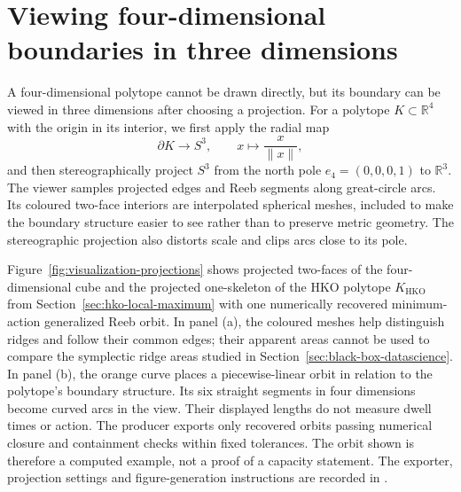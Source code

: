 \section{Viewing four-dimensional boundaries in three dimensions}
\label{sec:visualization-3d}

A four-dimensional polytope cannot be drawn directly, but its boundary can be
viewed in three dimensions after choosing a projection.  For a polytope
\(K\subset\mathbb R^4\) with the origin in its interior, we first apply the
radial map
\[
  \partial K\longrightarrow S^3,
  \qquad x\longmapsto \frac{x}{\lVert x\rVert},
\]
and then stereographically project \(S^3\) from the north pole
\(e_4=(0,0,0,1)\) to \(\mathbb R^3\).  The viewer samples projected edges and
Reeb segments along great-circle arcs.  Its coloured two-face interiors are
interpolated spherical meshes, included to make the boundary structure easier
to see rather than to preserve metric geometry.  The stereographic projection
also distorts scale and clips arcs close to its pole.

Figure~\ref{fig:visualization-projections} shows projected two-faces of the
four-dimensional cube and the projected one-skeleton of the HKO polytope
\(K_{\mathrm{HKO}}\) from Section~\ref{sec:hko-local-maximum} with one
numerically recovered minimum-action generalized Reeb orbit. In panel (a),
the coloured meshes help distinguish ridges and follow their common edges;
their apparent areas cannot be used to compare the symplectic ridge areas
studied in Section~\ref{sec:black-box-datascience}. In panel (b), the orange
curve places a piecewise-linear orbit in relation to the polytope's boundary
structure. Its six straight segments in four dimensions become curved arcs
in the view. Their displayed lengths do not measure dwell times or action.
The producer
exports only recovered orbits passing numerical closure and containment checks
within fixed tolerances.  The orbit shown is therefore a computed example, not
a proof of a capacity statement. The exporter, projection settings and
figure-generation instructions are recorded in
.

